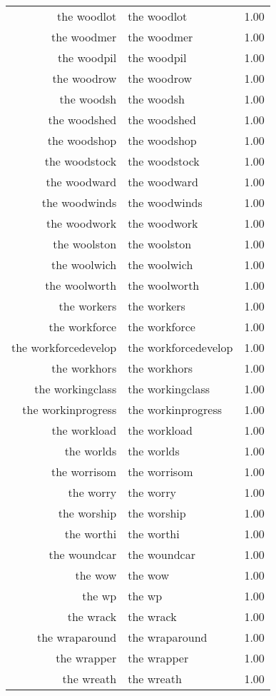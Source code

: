 \begin{table}[ht]
\begin{tabular}{rlr}
  the woodlot & the woodlot & 1.00 \\ 
  the woodmer & the woodmer & 1.00 \\ 
  the woodpil & the woodpil & 1.00 \\ 
  the woodrow & the woodrow & 1.00 \\ 
  the woodsh & the woodsh & 1.00 \\ 
  the woodshed & the woodshed & 1.00 \\ 
  the woodshop & the woodshop & 1.00 \\ 
  the woodstock & the woodstock & 1.00 \\ 
  the woodward & the woodward & 1.00 \\ 
  the woodwinds & the woodwinds & 1.00 \\ 
  the woodwork & the woodwork & 1.00 \\ 
  the woolston & the woolston & 1.00 \\ 
  the woolwich & the woolwich & 1.00 \\ 
  the woolworth & the woolworth & 1.00 \\ 
  the workers & the workers & 1.00 \\ 
  the workforce & the workforce & 1.00 \\ 
  the workforcedevelop & the workforcedevelop & 1.00 \\ 
  the workhors & the workhors & 1.00 \\ 
  the workingclass & the workingclass & 1.00 \\ 
  the workinprogress & the workinprogress & 1.00 \\ 
  the workload & the workload & 1.00 \\ 
  the worlds & the worlds & 1.00 \\ 
  the worrisom & the worrisom & 1.00 \\ 
  the worry & the worry & 1.00 \\ 
  the worship & the worship & 1.00 \\ 
  the worthi & the worthi & 1.00 \\ 
  the woundcar & the woundcar & 1.00 \\ 
  the wow & the wow & 1.00 \\ 
  the wp & the wp & 1.00 \\ 
  the wrack & the wrack & 1.00 \\ 
  the wraparound & the wraparound & 1.00 \\ 
  the wrapper & the wrapper & 1.00 \\ 
  the wreath & the wreath & 1.00 \\ 

\end{tabular}
\end{table}
